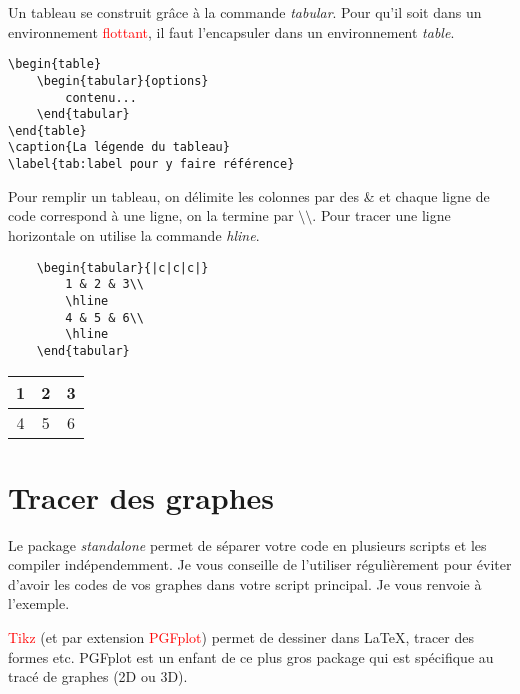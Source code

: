 \documentclass{beamer}
\begin{document}
\begin{frame}[fragile]
	Un tableau se construit grâce à la commande \textit{tabular}. Pour qu'il soit dans un environnement \textcolor{red}{flottant}, il faut l'encapsuler dans un environnement \textit{table}.
\begin{Verbatim}
\begin{table}
	\begin{tabular}{options}
		contenu...
	\end{tabular}
\end{table}
\caption{La légende du tableau}
\label{tab:label pour y faire référence}
\end{Verbatim}
\end{frame}

\begin{frame}[fragile]
	Pour remplir un tableau, on délimite les colonnes par des \& et chaque ligne de code correspond à une ligne, on la termine par $\setminus\setminus$. Pour tracer une ligne horizontale on utilise la commande \textit{hline}.
	\begin{Verbatim}
	\begin{tabular}{|c|c|c|}
		1 & 2 & 3\\
		\hline
		4 & 5 & 6\\
		\hline
	\end{tabular}
	\end{Verbatim}
	\vspace{.3cm}
	\begin{tabular}{|c|c|c|}
		\hline
		1 & 2 & 3\\
		\hline
		4 & 5 & 6\\
		\hline
	\end{tabular}
\end{frame}

\section{Tracer des graphes}

\begin{frame}[fragile]
	Le package \textit{standalone} permet de séparer votre code en plusieurs scripts et les compiler indépendemment. Je vous conseille de l'utiliser régulièrement pour éviter d'avoir les codes de vos graphes dans votre script principal. Je vous renvoie à l'exemple.
	
	\begin{definition}
		\textcolor{red}{Tikz} (et par extension \textcolor{red}{PGFplot}) permet de dessiner dans LaTeX, tracer des formes etc. PGFplot est un enfant de ce plus gros package qui est spécifique au tracé de graphes (2D ou 3D).
	\end{definition}
\end{frame}
\end{document}
